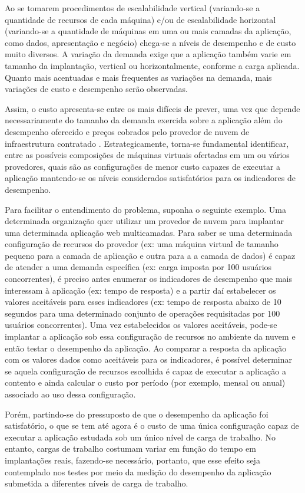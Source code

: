 Ao se tomarem procedimentos de escalabilidade vertical (variando-se a quantidade 
de recursos de cada máquina) e/ou de escalabilidade horizontal (variando-se a 
quantidade de máquinas em uma ou mais camadas da aplicação, como dados, apresentação 
e negócio) chega-se a níveis de desempenho e de custo muito diversos. A variação 
da demanda exige que a aplicação também varie em tamanho da implantação, vertical 
ou horizontalmente, conforme a carga aplicada. Quanto mais acentuadas e mais 
frequentes as variações na demanda, mais variações de custo e desempenho serão 
observadas.

Assim, o custo apresenta-se entre os mais difíceis de prever, uma vez que depende 
necessariamente do tamanho da demanda exercida sobre a aplicação além do desempenho 
oferecido e preços cobrados pelo provedor de nuvem de infraestrutura contratado 
\cite{cunha2012ambiente}. Estrategicamente, torna-se fundamental identificar, 
entre as possíveis composições de máquinas virtuais ofertadas em um ou vários 
provedores, quais são as configurações de menor custo capazes de executar a 
aplicação mantendo-se os níveis considerados satisfatórios para os indicadores de desempenho.

Para facilitar o entendimento do problema, suponha o seguinte exemplo. Uma
determinada organização quer utilizar um provedor de nuvem para implantar uma
determinada aplicação web multicamadas. Para saber se uma determinada 
configuração de recursos do provedor (ex: uma máquina virtual de tamanho
pequeno para a camada de aplicação e outra para a a camada de dados) é capaz de
atender a uma demanda específica (ex: carga imposta por 100 usuários
concorrentes), é preciso antes enumerar os indicadores de desempenho que mais
interessam à aplicação (ex: tempo de resposta) e a partir daí estabelecer os
valores aceitáveis para esses indicadores (ex: tempo de resposta abaixo de 10
segundos para uma determinado conjunto de operações requisitadas por 100 usuários concorrentes).
Uma vez estabelecidos os valores aceitáveis, pode-se implantar a aplicação 
sob essa configuração de recursos no ambiente da nuvem e então testar o
desempenho da aplicação. Ao comparar a resposta da aplicação com os valores
dados como aceitáveis para os indicadores, é possível determinar se aquela 
configuração de recursos escolhida é capaz de executar a aplicação a contento e 
ainda calcular o custo por período (por exemplo, mensal ou anual) associado ao uso dessa configuração.

Porém, partindo-se do pressuposto de que o desempenho da aplicação foi satisfatório, 
o que se tem até agora é o custo de uma única configuração capaz de executar a 
aplicação estudada sob um único nível de carga de trabalho. No entanto, cargas de 
trabalho costumam variar em função do tempo em implantações reais, fazendo-se 
necessário, portanto, que esse efeito seja contemplado nos testes por meio da 
medição do desempenho da aplicação submetida a diferentes níveis de carga de 
trabalho.

